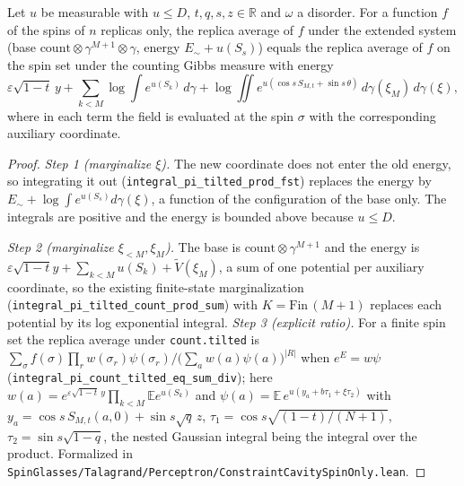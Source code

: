 \begin{proposition}\label{prop:sg-tal:perceptron-cavity-spin-only}
  \leanok
Let $u$ be measurable with $u\le D$, $t,q,s,z\in\mathbb R$ and $\omega$ a disorder. For a function $f$ of the spins of $n$ replicas only, the replica average of $f$ under the extended system
(base $\mathrm{count}\otimes\gamma^{M+1}\otimes\gamma$, energy $E_\sim+u(S_s)$) equals the replica average of $f$ on the spin set under the counting Gibbs measure with energy
\[
 \varepsilon\sqrt{1-t}\,y+\sum_{k<M}\log\int e^{u(S_k)}\,d\gamma+\log\iint e^{u(\cos s\,S_{M,t}+\sin s\,\theta)}\,d\gamma(\xi_M)\,d\gamma(\xi),
\]
where in each term the field is evaluated at the spin $\sigma$ with the corresponding auxiliary coordinate.
\end{proposition}
\begin{proof}
  \leanok
\emph{Step 1 (marginalize $\xi$).} The new coordinate does not enter the old energy, so integrating it out (\texttt{integral\_pi\_tilted\_prod\_fst}) replaces the energy by
$E_\sim+\log\int e^{u(S_s)}d\gamma(\xi)$, a function of the configuration of the base only. The integrals are positive and the energy is bounded above because $u\le D$.

\emph{Step 2 (marginalize $\xi_{<M},\xi_M$).} The base is $\mathrm{count}\otimes\gamma^{M+1}$ and the energy is $\varepsilon\sqrt{1-t}y+\sum_{k<M}u(S_k)+\widetilde V(\xi_M)$, a sum of one potential per auxiliary coordinate,
so the existing finite-state marginalization (\texttt{integral\_pi\_tilted\_count\_prod\_sum}) with $K=\mathrm{Fin}\,(M+1)$ replaces each potential by its log exponential integral.
\emph{Step 3 (explicit ratio).} For a finite spin set the replica average under \texttt{count.tilted} is $\sum_\sigma f(\sigma)\prod_rw(\sigma_r)\psi(\sigma_r)\big/\bigl(\sum_aw(a)\psi(a)\bigr)^{|R|}$ when $e^{E}=w\psi$ (\texttt{integral\_pi\_count\_tilted\_eq\_sum\_div}); here $w(a)=e^{\varepsilon\sqrt{1-t}\,y}\prod_{k<M}\mathbb E e^{u(S_k)}$ and $\psi(a)=\mathbb E\,e^{u(y_a+b\tau_1+\xi\tau_2)}$ with $y_a=\cos s\,S_{M,t}(a,0)+\sin s\sqrt q\,z$, $\tau_1=\cos s\sqrt{(1-t)/(N+1)}$, $\tau_2=\sin s\sqrt{1-q}$, the nested Gaussian integral being the integral over the product.
Formalized in \texttt{SpinGlasses/Talagrand/Perceptron/ConstraintCavitySpinOnly.lean}.
\end{proof}

